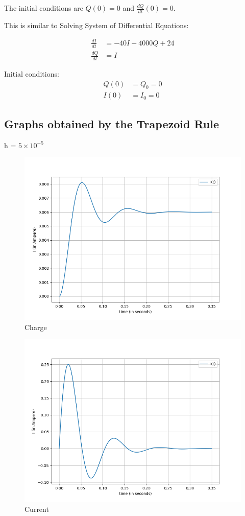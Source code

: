 \documentclass{article}
\begin{document}
The initial conditions are \( Q(0) = 0 \) and \( \frac{dQ}{dt}(0) = 0 \).

This is similar to Solving System of Differential Equations:

\begin{align*}
    \frac{dI}{dt} &= -40I - 4000Q + 24 \\
    \frac{dQ}{dt} &= I
\end{align*}

Initial conditions:
\begin{align*}
    Q(0) &= Q_0 = 0 \\
    I(0) &= I_0 = 0
\end{align*}
\subsection*{Graphs obtained by the Trapezoid Rule}
h = $5 \times 10^{-5}$
\begin{figure}[H]
    \centering
    \includegraphics[width = 13cm]{save_0.png}
    \caption{Charge}
    \label{fig:Charge}
\end{figure}

\begin{figure}[H]
    \centering
    \includegraphics[width = 13cm]{save_1.png}
    \caption{Current}
    \label{fig:Current}
\end{figure}
\end{document}
